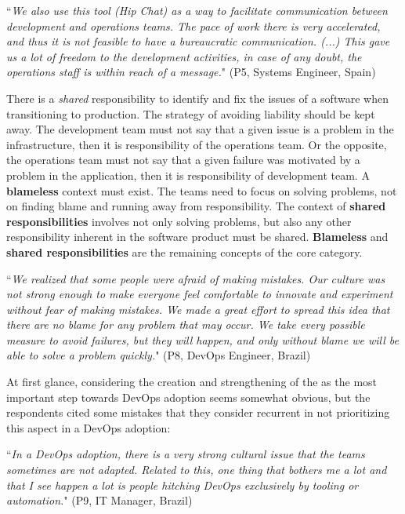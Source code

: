 \begin{mq}
``\emph{We also use this tool (Hip Chat) as a way to facilitate communication between
development and operations teams. The pace of work there is very accelerated, and thus
it is not feasible to have a bureaucratic communication. (...) This gave us a lot of
freedom to the development activities, in case of any doubt, the operations staff
is within reach of a message.}" (P5, Systems Engineer, Spain)
\end{mq}

There is a \emph{shared} responsibility to identify and fix the issues
of a software when transitioning to production. The strategy of avoiding liability should be kept away.
The development team must not say that a given issue is a problem in the infrastructure, then
it is responsibility of the operations team. Or the opposite, the operations team
must not say that a given failure was motivated by a problem in the application, then it is
responsibility of development team. A \textbf{blameless} context must exist.
The teams need to focus on solving problems, not on finding blame and
running away from responsibility. The context of \textbf{shared
responsibilities} involves not only solving problems, but also any other
responsibility inherent in the software product must be shared.
\textbf{Blameless} and \textbf{shared responsibilities} are the remaining
concepts of the core category.

\begin{mq}
``\emph{We realized that some people were afraid of making mistakes. Our
culture was not strong enough to make everyone feel comfortable to innovate and
experiment without fear of making mistakes. We made a great effort to spread
this idea that there are no blame for any problem that may occur. We take every possible
measure to avoid failures, but they
will happen, and only without blame we will be able to solve a problem quickly.}" (P8,
DevOps Engineer, Brazil)
\end{mq}

At first glance, considering the creation and strengthening of the \cc as the most important step towards DevOps adoption seems somewhat obvious, but
the respondents cited some mistakes that they consider recurrent in not
prioritizing this aspect in a DevOps adoption:

\begin{mq}``\emph{In a DevOps adoption, there is a very strong cultural issue that the teams
sometimes are not adapted. Related to this, one thing that bothers me a lot and
that I see happen a lot is people hitching DevOps exclusively by tooling or
automation.}" (P9, IT Manager, Brazil)
\end{mq}

